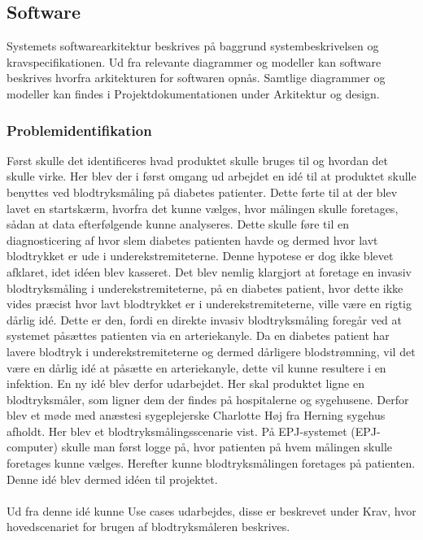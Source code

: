 \subsection{Software}
Systemets softwarearkitektur beskrives på baggrund systembeskrivelsen og kravspecifikationen. Ud fra relevante diagrammer og modeller kan software beskrives hvorfra arkitekturen for softwaren opnås. Samtlige diagrammer og modeller kan findes i Projektdokumentationen under Arkitektur og design.
\subsubsection{Problemidentifikation}
Først skulle det identificeres hvad produktet skulle bruges til og hvordan det skulle virke. Her blev der i først omgang ud arbejdet en idé til at produktet skulle benyttes ved blodtryksmåling på diabetes patienter. Dette førte til at der blev lavet en startskærm, hvorfra det kunne vælges, hvor målingen skulle foretages, sådan at data efterfølgende kunne analyseres. Dette skulle føre til en diagnosticering af hvor slem diabetes patienten havde og dermed hvor lavt blodtrykket er ude i underekstremiteterne. Denne hypotese er dog ikke blevet afklaret, idet idéen blev kasseret. Det blev nemlig klargjort at foretage en invasiv blodtryksmåling i underekstremiteterne, på en diabetes patient, hvor dette ikke vides præcist hvor lavt blodtrykket er i underekstremiteterne, ville være en rigtig dårlig idé. Dette er den, fordi en direkte invasiv blodtryksmåling foregår ved at systemet påsættes patienten via en arteriekanyle. Da en diabetes patient har lavere blodtryk i underekstremiteterne og dermed dårligere blodstrømning, vil det være en dårlig idé at påsætte en arteriekanyle, dette vil kunne resultere i en infektion. En ny idé blev derfor udarbejdet. Her skal produktet ligne en blodtryksmåler, som ligner dem der findes på hospitalerne og sygehusene. Derfor blev et møde med anæstesi sygeplejerske Charlotte Høj fra Herning sygehus afholdt. Her blev et blodtryksmålingsscenarie vist. På EPJ-systemet (EPJ-computer) skulle man først logge på, hvor patienten på hvem målingen skulle foretages kunne vælges. Herefter kunne blodtryksmålingen foretages på patienten. Denne idé blev dermed idéen til projektet.\\\\
Ud fra denne idé kunne Use cases udarbejdes, disse er beskrevet under Krav, hvor hovedscenariet for brugen af blodtryksmåleren beskrives.
